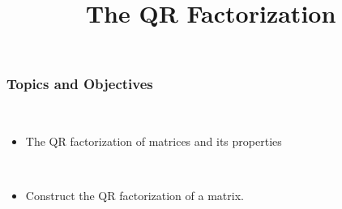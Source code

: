 \title{The QR Factorization}
\subtitle{\SubTitleName}
\institute[]{\Course}
\author{\Instructor}
\maketitle   
  


\begin{frame}\frametitle{Topics and Objectives}
     \\
    \begin{itemize}
        \item  The QR factorization of matrices and its properties
    \end{itemize}
    
    \vspace{0.5cm}
    
    \\
    
    
    \begin{itemize}
    
    \item  Construct the QR factorization of a matrix.
      
    \end{itemize}
    
    \vspace{0.25cm} 
 
\end{frame}



